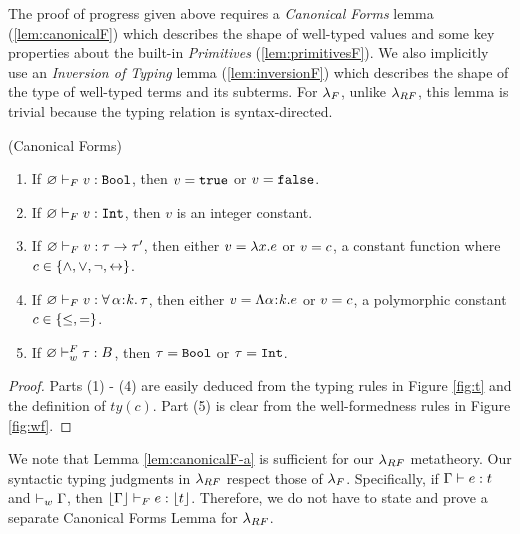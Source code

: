 \begin{fullversion}
%
The proof of progress given above requires a \emph{Canonical Forms} 
lemma (\cref{lem:canonicalF}) which describes the 
shape of well-typed values and some key properties 
about the built-in \emph{Primitives} (\cref{lem:primitivesF}).
%
We also implicitly use an \emph{Inversion of Typing} 
lemma (\cref{lem:inversionF}) which describes the shape of the 
type of well-typed terms and its subterms. For $\lambda_{F}$, 
unlike $\lambda_{RF}$, this lemma
is trivial because the typing relation is syntax-directed.


\begin{lemma}\label{lem:canonicalF} (Canonical Forms) 
\begin{enumerate}
    \item If ${\varnothing} \vdash_F {v} : {\texttt{Bool}}$, 
        then $v = \mathtt{true}$ or $v = \mathtt{false}$.
    \item If ${\varnothing} \vdash_F {v} : {\texttt{Int}}$, then $v$ is an integer constant.
    \item If ${\varnothing} \vdash_F {v} : {\tau \rightarrow \tau'}$, 
        then either $v = \lambda x. {e}$ or $v = c$, 
        a constant function where 
        $c \in \{\wedge, \vee, \neg, \leftrightarrow \}$.
    \item If ${\varnothing} \vdash_F {v} : {\forall\, \alpha\hspace{0.05em}{:}\hspace{0.05em} k.\, \tau}$, 
        then either $v = \Lambda{\alpha}\hspace{0.05em}{:}\hspace{0.05em}{\ensuremath{k}}.{e}$ 
        or $v = c$, a polymorphic constant $c \in \{\leq, =\}$.
    \item If ${\varnothing} \vdash_w^F {\tau} : {B}$,
        then $\tau = \texttt{Bool}$ or $\tau = \texttt{Int}$.
\end{enumerate}
\end{lemma}
\begin{proof}
    Parts (1) - (4) are easily deduced from the \sysf typing rules 
    in Figure \ref{fig:t} and the definition of $ty(c)$. 
    Part (5) is clear from the well-formedness rules in Figure \ref{fig:wf}.
\end{proof}

We note that 
Lemma \ref{lem:canonicalF-a} is sufficient for our $\lambda_{RF}$ metatheory.
Our syntactic typing judgments in $\lambda_{RF}$ respect those of $\lambda_{F}$.
Specifically, if ${\mathrm{\Gamma}} \vdash {\ensuremath{e}} : {t}$ and 
$\vdash_w {\mathrm{\Gamma}}$, then
${\lfloor{\mathrm{\Gamma}}\rfloor} \vdash_F {e} : {\lfloor{\ensuremath{t}}\rfloor}$.
Therefore, we do not have to state and 
prove a separate Canonical Forms Lemma for $\lambda_{RF}$.


\end{fullversion}
